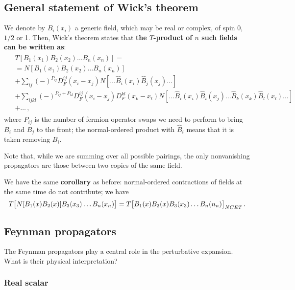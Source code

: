 \documentclass[main.tex]{subfiles}
\begin{document}
\subsection{General statement of Wick's theorem}

We denote by \(B_i (x_i)\) a generic field, which may be real or complex, of spin 0, \(1/2\) or 1. Then, Wick's theorem states that \textbf{the \(T\)-product of \(n\) such fields can be written as}: 
%
\begin{align}
\begin{split}
& T[B_1 (x_1 ) B_2 (x_2 ) \dots B_n (x_n)]= \\
&= N[B_1 (x_1 ) B_2 (x_2 ) \dots B_n (x_n)]  \\
&+ \sum _{ij} (-)^{P_{ij}} D_F^{ij}(x_i - x_j) N[ \dots \hat{B}_{i}(x_i) \hat{B}_{j}(x_j)\dots]  \\
&+ \sum _{ijkl} (-)^{P_{ij}+P_{kl}} D_F^{ij}(x_i - x_j) D_F^{kl}(x_k - x_l)  N[\dots \hat{B}_{i}(x_i) \hat{B}_{i}(x_j)\dots \hat{B}_{k}(x_k) \hat{B}_{l}(x_l)\dots]  \\
&+ \dots \,,
\end{split}
\end{align}
%
where \(P_{ij}\) is the number of fermion operator swaps we need to perform to bring \(B_i\) and \(B_j\) to the front; the normal-ordered product with \(\hat{B}_i\) means that it is taken removing \(B_i\). 


Note that, while we are summing over all possible pairings, the only nonvanishing propagators are those between two copies of the same field. 

We have the same \textbf{corollary} as before: normal-ordered contractions of fields at the same time do not contribute; we have 
%
\begin{align}
T \qty[N[B_1 (x) B_2 (x)] B_3 (x_3 ) \dots B_n (x_n)] 
= T \qty[B_1 (x) B_2 (x) B_3 (x_3) \dots B_n (n_n)]_{NCET}
\,.
\end{align}

\subsection{Feynman propagators}

The Feynman propagators play a central role in the perturbative expansion. What is their physical interpretation?

\subsubsection{Real scalar}
\end{document}
